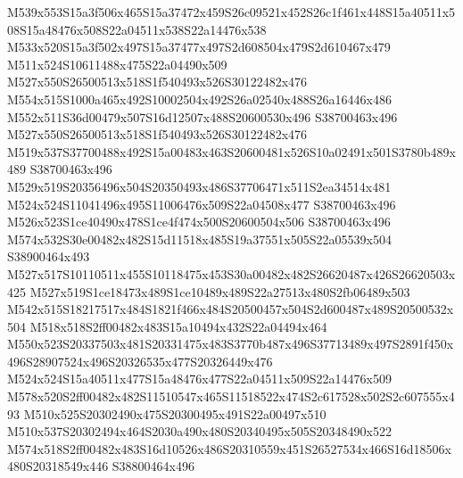 \documentclass{article}
\begin{document}
\begin{multicols}{2}
M539x553S15a3f506x465S15a37472x459S26c09521x452S26c1f461x448S15a40511x508S15a48476x508S22a04511x538S22a14476x538 M533x520S15a3f502x497S15a37477x497S2d608504x479S2d610467x479 M511x524S10611488x475S22a04490x509 M527x550S26500513x518S1f540493x526S30122482x476 M554x515S1000a465x492S10002504x492S26a02540x488S26a16446x486 M552x511S36d00479x507S16d12507x488S20600530x496 S38700463x496 M527x550S26500513x518S1f540493x526S30122482x476 M519x537S37700488x492S15a00483x463S20600481x526S10a02491x501S3780b489x489 S38700463x496 M529x519S20356496x504S20350493x486S37706471x511S2ea34514x481 M524x524S11041496x495S11006476x509S22a04508x477 S38700463x496 M526x523S1ce40490x478S1ce4f474x500S20600504x506 S38700463x496 M574x532S30e00482x482S15d11518x485S19a37551x505S22a05539x504 S38900464x493 M527x517S10110511x455S10118475x453S30a00482x482S26620487x426S26620503x425 M527x519S1ce18473x489S1ce10489x489S22a27513x480S2fb06489x503 M542x515S18217517x484S1821f466x484S20500457x504S2d600487x489S20500532x504 M518x518S2ff00482x483S15a10494x432S22a04494x464 M550x523S20337503x481S20331475x483S3770b487x496S37713489x497S2891f450x496S28907524x496S20326535x477S20326449x476 M524x524S15a40511x477S15a48476x477S22a04511x509S22a14476x509 M578x520S2ff00482x482S11510547x465S11518522x474S2c617528x502S2c607555x493 M510x525S20302490x475S20300495x491S22a00497x510 M510x537S20302494x464S2030a490x480S20340495x505S20348490x522 M574x518S2ff00482x483S16d10526x486S20310559x451S26527534x466S16d18506x480S20318549x446 S38800464x496




\end{multicols}
\end{document}
